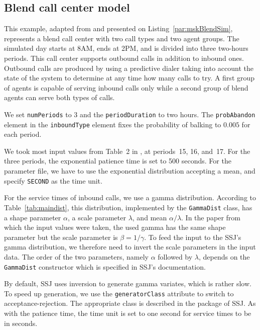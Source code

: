 \subsection{Blend call center model}
\label{sec:mskBlend}

This example, adapted from \cite{ccDES07a} and presented on
Listing~\ref{par:mskBlendSim}, represents a blend call
center with two call types and two agent groups.
The simulated day starts at 8AM, ends at 2PM, and is
divided into three two-hours periods.
This call center supports outbound calls in addition to inbound ones.
Outbound calls are produced by using a predictive
dialer taking into account the state of the system to determine at any
time how many calls to try.
A first group of agents is capable of serving inbound calls only while
a second group of blend agents can serve both types of calls.



We set \texttt{num\-Periods} to 3 and the
\texttt{period\-Duration} to two hours.
The \texttt{prob\-Abandon} element in the \texttt{inbound\-Type} element
fixes the probability of balking to $0.005$ for each period.

We took most input values from Table~2 in \cite{ccDES07a}, at
periods~15, 16, and~17.
For the three periods, the exponential patience time is set to 500
seconds.  For the parameter file, we have to
use the exponential distribution accepting a mean, and specify
\texttt{SECOND} as the time unit.

For the service times of inbound calls, we use a gamma distribution.
According to Table~\ref{tab:maindist}, this distribution,
implemented by the \texttt{Gamma\-Dist} class, has a
shape parameter $\alpha$, a scale parameter $\lambda$, and mean
$\alpha/\lambda$.  In the
paper from which the input values were taken, the used gamma has the
same shape
parameter but the scale parameter is $\beta=1/\gamma$.  To feed the
input to the SSJ's gamma distribution, we therefore need to invert the
scale parameters in the input data.
The order of the two parameters,
namely $\alpha$ followed by
$\lambda$,
depends on the \texttt{Gamma\-Dist}
constructor which is specified in SSJ's documentation.

By default, SSJ uses inversion to generate gamma variates, which
is rather slow.  To speed up generation, we use the
\texttt{generator\-Class} attribute to switch to
acceptance-rejection.  The appropriate class is described in the
 package of SSJ.
As with the patience time, the time unit is set to one second for
service times to be in seconds.

